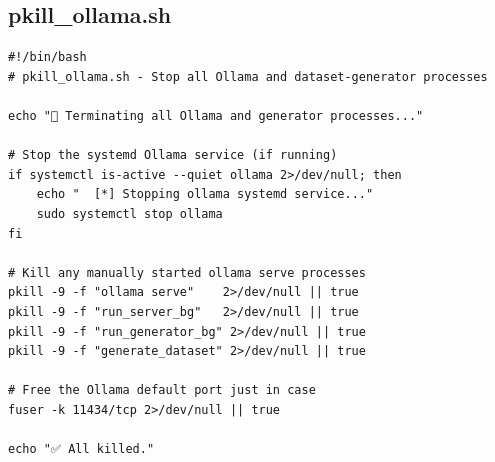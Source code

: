 \documentclass[11pt]{article}
\begin{document}
\newpage
\subsection{pkill\_ollama.sh}
\begin{lstlisting}[style=bashstyle, caption={pkill\_ollama.sh}]
#!/bin/bash
# pkill_ollama.sh - Stop all Ollama and dataset-generator processes

echo "🛑 Terminating all Ollama and generator processes..."

# Stop the systemd Ollama service (if running)
if systemctl is-active --quiet ollama 2>/dev/null; then
    echo "  [*] Stopping ollama systemd service..."
    sudo systemctl stop ollama
fi

# Kill any manually started ollama serve processes
pkill -9 -f "ollama serve"    2>/dev/null || true
pkill -9 -f "run_server_bg"   2>/dev/null || true
pkill -9 -f "run_generator_bg" 2>/dev/null || true
pkill -9 -f "generate_dataset" 2>/dev/null || true

# Free the Ollama default port just in case
fuser -k 11434/tcp 2>/dev/null || true

echo "✅ All killed."
\end{lstlisting}
\end{document}
